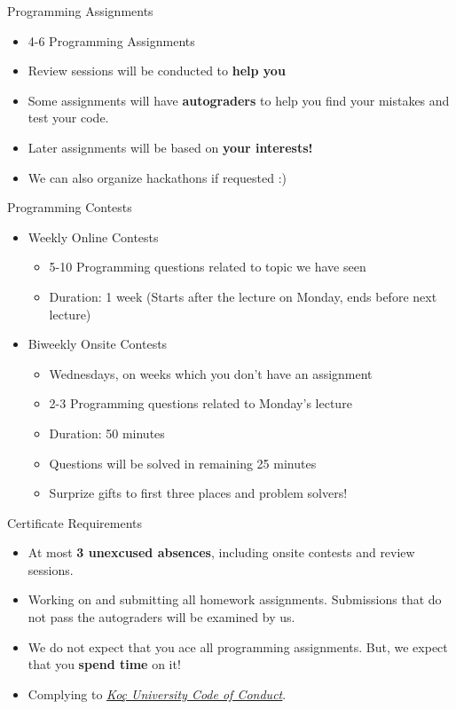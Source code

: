 		\begin{frame}{Programming Assignments}
			\begin{itemize}
				\LARGE
				\item 4-6 Programming Assignments
				\item Review sessions will be conducted to \textbf{help you}
				\item Some assignments will have \textbf{autograders} to help you find your mistakes and test your code.
				\item Later assignments will be based on \textbf{your interests!}
				\item We can also organize hackathons if requested :)
			\end{itemize}
			\LARGE
			
		\end{frame}

		\begin{frame}{Programming Contests}
			\begin{itemize}
				\LARGE
				\item Weekly Online Contests
					\begin{itemize}
						\Large
						\item 5-10 Programming questions related to topic we have seen
						\item Duration: 1 week (Starts after the lecture on Monday, ends before next lecture)
						
					\end{itemize}
				\item Biweekly Onsite Contests
					\begin{itemize}
						\Large
						\item Wednesdays, on weeks which you don't have an assignment
						\item 2-3 Programming questions related to Monday's lecture
						\item Duration: 50 minutes
						\item Questions will be solved in remaining 25 minutes
						\item Surprize gifts to first three places and problem solvers!
					\end{itemize}
			\end{itemize}
		\end{frame}

		\begin{frame}{Certificate Requirements}
			\begin{itemize}
				\LARGE
				\item At most \textbf{3 unexcused absences}, including onsite contests and review sessions.
				\item Working on and submitting all homework assignments. Submissions that do not pass the autograders will be examined by us.
				\item We do not expect that you ace all programming assignments. But, we expect that you \textbf{spend time} on it!
				\item Complying to \href{https://vpaa.ku.edu.tr/academic/student-code-of-conduct}{\underline{\textit{Koç University Code of Conduct}}}. 
			\end{itemize}
		\end{frame}

